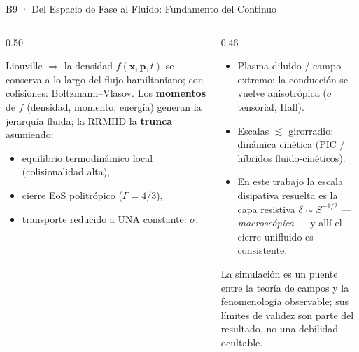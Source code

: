 \documentclass[aspectratio=169,9pt]{beamer}
\begin{document}
\begin{frame}{B9 · Del Espacio de Fase al Fluido: Fundamento del Continuo}
\begin{columns}[T]
\begin{column}{0.50\textwidth}
  \begin{tcolorbox}[EQ={La jerarqu\'ia de momentos}]
    \scriptsize
    Liouville $\Rightarrow$ la densidad $f(\mathbf x,\mathbf p,t)$ se
    conserva a lo largo del flujo hamiltoniano; con colisiones:
    Boltzmann--Vlasov. Los \textbf{momentos} de $f$ (densidad, momento,
    energ\'ia) generan la jerarqu\'ia fluida; la RRMHD la \textbf{trunca}
    asumiendo:
    \begin{itemize}\setlength\itemsep{1pt}
      \item equilibrio termodin\'amico local (colisionalidad alta),
      \item cierre EoS politr\'opico ($\Gamma=4/3$),
      \item transporte reducido a UNA constante: $\sigma$.
    \end{itemize}
  \end{tcolorbox}
\end{column}
\begin{column}{0.46\textwidth}
  \begin{tcolorbox}[WRN={D\'onde colapsa la aproximaci\'on}]
    \scriptsize
    \begin{itemize}\setlength\itemsep{2pt}
      \item Plasma diluido / campo extremo: la conducci\'on se vuelve
            anisotr\'opica ($\sigma$ tensorial, Hall).
      \item Escalas $\lesssim$ girorradio: din\'amica cin\'etica
            (PIC / h\'ibridos fluido-cin\'eticos).
      \item En este trabajo la escala disipativa resuelta es la capa
            resistiva $\delta\sim S^{-1/2}$ --- \emph{macrosc\'opica} ---
            y all\'i el cierre unifluido es consistente.
    \end{itemize}
  \end{tcolorbox}
  \vspace{0.08cm}
  {\scriptsize\color{INF3} La simulaci\'on es un puente entre la teor\'ia de
   campos y la fenomenolog\'ia observable; sus l\'imites de validez son
   parte del resultado, no una debilidad ocultable.}
\end{column}
\end{columns}
\end{frame}
\end{document}

